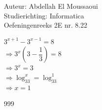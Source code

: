 \documentclass[a4paper]{article}
\begin{document}
  
\noindent \large Auteur: Abdellah El Moussaoui \\
\noindent \large Studierichting: Informatica\\
\noindent \large Oefeningenreeks 2E nr. 8.22\\

\medskip

\normalsize

$3^{x+1} - 3^{x-1} = 8$\\

$\Rightarrow 3^x \left(3-\dfrac{1}{3}\right) = 8$\\

$\Rightarrow 3^x = 3$\\

$\Rightarrow \log_33^x = \log_33^1$\\

$\Rightarrow \boxed{x = 1}$\\


\begin{thebibliography}{999}
\end{thebibliography}
\end{document}
